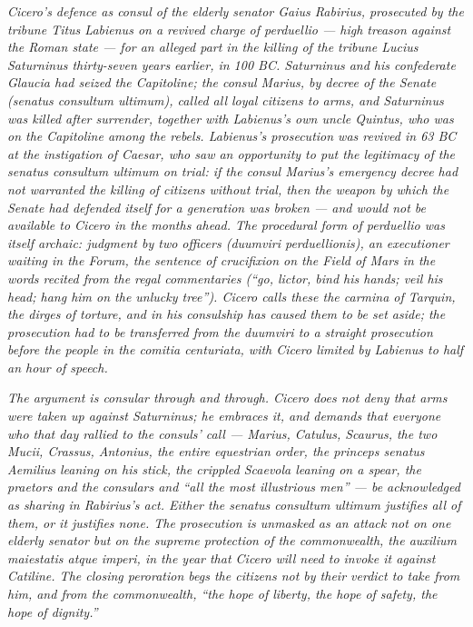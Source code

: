 
\textit{Cicero's defence as consul of the elderly senator
Gaius Rabirius, prosecuted by the tribune Titus Labienus on a
revived charge of \textit{perduellio} --- high treason against
the Roman state --- for an alleged part in the killing of the
tribune Lucius Saturninus thirty-seven years earlier, in 100
BC. Saturninus and his confederate Glaucia had seized the
Capitoline; the consul Marius, by decree of the Senate
(\textit{senatus consultum ultimum}), called all loyal
citizens to arms, and Saturninus was killed after surrender,
together with Labienus's own uncle Quintus, who was on the
Capitoline among the rebels. Labienus's prosecution was
revived in 63 BC at the instigation of Caesar, who saw an
opportunity to put the legitimacy of the senatus consultum
ultimum on trial: if the consul Marius's emergency decree had
not warranted the killing of citizens without trial, then the
weapon by which the Senate had defended itself for a generation
was broken --- and would not be available to Cicero in the
months ahead. The procedural form of \textit{perduellio} was
itself archaic: judgment by two officers (\textit{duumviri
perduellionis}), an executioner waiting in the Forum, the
sentence of crucifixion on the Field of Mars in the words
recited from the regal commentaries (``go, lictor, bind his
hands; veil his head; hang him on the unlucky tree''). Cicero
calls these the carmina of Tarquin, the dirges of torture, and
in his consulship has caused them to be set aside; the
prosecution had to be transferred from the duumviri to a
straight prosecution before the people in the comitia
centuriata, with Cicero limited by Labienus to half an hour
of speech.}

\textit{The argument is consular through and through. Cicero
does not deny that arms were taken up against Saturninus; he
embraces it, and demands that everyone who that day rallied to
the consuls' call --- Marius, Catulus, Scaurus, the two
Mucii, Crassus, Antonius, the entire equestrian order, the
princeps senatus Aemilius leaning on his stick, the crippled
Scaevola leaning on a spear, the praetors and the consulars
and ``all the most illustrious men'' --- be acknowledged as
sharing in Rabirius's act. Either the senatus consultum
ultimum justifies all of them, or it justifies none. The
prosecution is unmasked as an attack not on one elderly
senator but on the supreme protection of the commonwealth, the
\textit{auxilium maiestatis atque imperi}, in the year that
Cicero will need to invoke it against Catiline. The closing
peroration begs the citizens not by their verdict to take from
him, and from the commonwealth, ``the hope of liberty, the
hope of safety, the hope of dignity.''}

